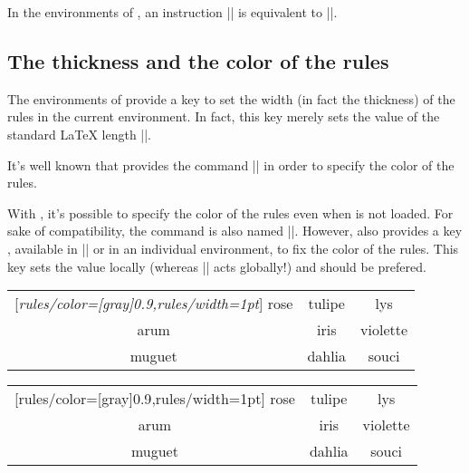 \documentclass[dvipsnames]{article}%
\begin{document}
\medskip
In the environments of , an instruction || 
is equivalent to ||.


\subsection{The thickness and the color of the rules}


The environments of  provide a key  to
set the width (in fact the thickness) of the rules in the current environment.
In fact, this key merely sets the value of the standard LaTeX length
|\arrayrulewidth|.

\smallskip
It's well known that  provides the command |\arrayrulecolor| in
order to specify the color of the rules.

\smallskip
{}
With , it's possible to specify the color of the rules even when
 is not loaded. For sake of compatibility, the command is also
named |\arrayrulecolor|. However,  also provides a key
, available in |\NiceMatrixOptions| or in an individual 
environment, to fix the color of the rules. This key sets the value locally
(whereas |\arrayrulecolor| acts globally!) and should be prefered.

\medskip
\begin{Code}[width=15cm]
\begin{NiceTabular}{|ccc|}[\emph{rules/color=[gray]{0.9},rules/width=1pt}]
\hline
rose & tulipe & lys \\
arum & iris & violette \\
muguet & dahlia & souci \\
\hline
\end{NiceTabular}
\end{Code}
\hspace{-5cm}
\begin{NiceTabular}{|ccc|}[rules/color=[gray]{0.9},rules/width=1pt]
\hline
rose & tulipe & lys \\
arum & iris & violette \\
muguet & dahlia & souci \\
\hline
\end{NiceTabular}
\end{document}
